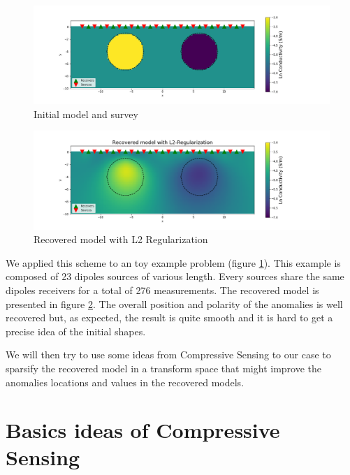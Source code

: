 \documentclass[twoside]{article}
\begin{document}
\begin{figure}[t!]
    \centering
    \includegraphics[width=0.8\linewidth]{figures/initialmodel.png}
    \caption{Initial model and survey}
    \label{InitialModel}
\end{figure}

  
\begin{figure}[t!]
    \centering
    \includegraphics[width=0.8\linewidth]{figures/recoveredModel.png}
    \caption{Recovered model with L2 Regularization}
    \label{L2Model}
\end{figure}

We applied this scheme to an toy example problem (figure \ref{InitialModel}). This example is composed of 23 dipoles sources of various length. Every sources share the same dipoles receivers for a total of 276 measurements. The recovered model is presented in figure \ref{L2Model}. The overall position and polarity of the anomalies is well recovered but, as expected, the result is quite smooth and it is hard to get a precise idea of the initial shapes.

We will then try to use some ideas from Compressive Sensing to our case to sparsify the recovered model in a transform space that might improve the anomalies locations and values in the recovered models.

\newpage

\section{Basics ideas of Compressive Sensing}
\end{document}
